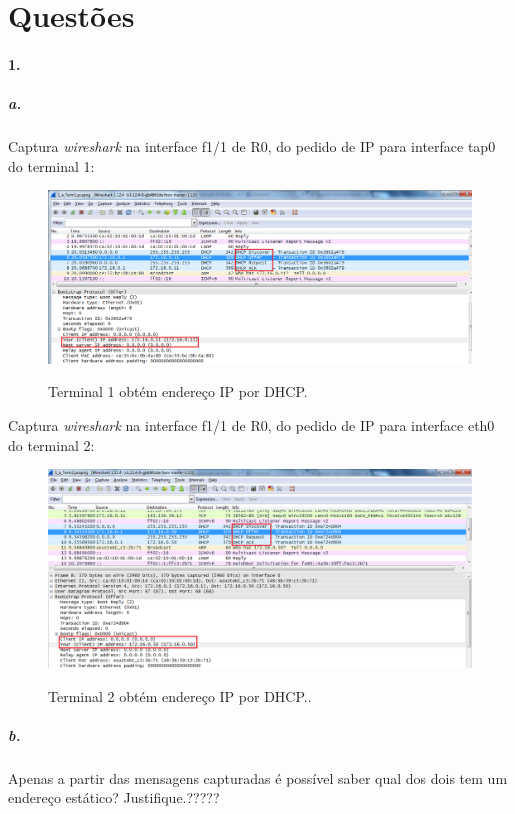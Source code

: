 \section*{Questões}
\paragraph{1.}

\subparagraph{a.}
Captura \emph{wireshark} na interface f1/1 de \textsf{R0}, do pedido de IP para interface \textsf{tap0} do \textsf{terminal 1}:

\begin{figure}[h]
\centering
\includegraphics[width=1\textwidth, height=0.3\textheight]{1_a_Terminal1.png}
\label{fig:Term1 DHCP}
\caption{Terminal 1 obtém endereço IP por DHCP.}
\end{figure}

Captura \emph{wireshark} na interface f1/1 de \textsf{R0}, do pedido de IP para interface \textsf{eth0 } do \textsf{terminal 2}:

\begin{figure}[h]
\centering
\includegraphics[width=1\textwidth, height=0.33\textheight]{1_a_Terminal2.png}
\label{fig:Term2 DHCP}
\caption{Terminal 2 obtém endereço IP por DHCP..}
\end{figure}


\subparagraph{b.}
Apenas a partir das mensagens capturadas é possível saber qual dos dois tem um endereço estático? Justifique.?????

